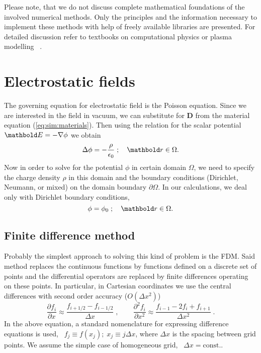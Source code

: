 Please note, that we do not discuss complete mathematical foundations of the involved numerical methods. Only the principles and the 
information necessary to implement these methods with help of
freely available libraries are presented. For detailed discussion refer to textbooks on
computational physics or plasma modelling \eg\ \cite{fenicsbook,bossavit1998,birdsall1991,hockney1988}.


\section{Electrostatic fields}

The governing equation for electrostatic field is the Poisson
equation. Since we are interested in the field in vacuum, we can substitute
for $\mathbold{D}$ from the material equation (\ref{eq:sim:materials}). Then using the relation for the scalar potential $\mb E = -\nabla \phi$ we obtain
\begin{equation}
\Delta\phi=-\frac{\rho}{\epsilon_{0}}\;;\quad \mb r\in\Omega\text{.}
\end{equation}
Now in order to solve for the potential $\phi$ in certain domain $\Omega$, we need to specify the
charge density $\rho$ in this domain and the boundary conditions (Dirichlet, Neumann, or mixed)
on the domain boundary $\partial\Omega$. In our calculations, we deal only with Dirichlet boundary
conditions, \ie
\begin{equation}
\phi=\phi_{0}\;;\quad \mb r\in\Omega\text{.}
\end{equation}

\subsection{Finite difference method}
Probably the simplest approach to solving this kind of problem is the \ac{FDM}.
Said method replaces the continuous functions by functions defined on a discrete set of points and
the differential operators are replaced by finite differences operating on these points.
In particular, in Cartesian coordinates we use the central differences with second order accuracy 
($O(\Delta x^2)$)
\begin{equation}
\frac{\partial f_i}{\partial x} \approx \frac{f_{i+1/2} - f_{i-1/2}}{\Delta x}\;,\qquad
\frac{\partial^2 f_i}{\partial x^2} \approx \frac{f_{i-1} - 2f_i + f_{i+1}}{\Delta x^2}\;.
\end{equation}
In the above equation, a standard nomenclature for expressing difference equations is used, \ie\ 
$f_j \equiv f(x_j);\; x_j \equiv j\Delta x$, where $\Delta x$ is the spacing between grid points.
We assume the simple case of homogeneous grid, \ie\ $\Delta x = \text{const.}$.

